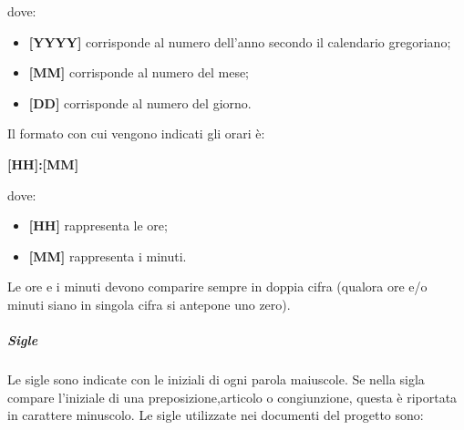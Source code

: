     dove:
    \begin{itemize}
        \item \textbf{[YYYY]} corrisponde al numero dell'anno secondo il calendario gregoriano;
        \item \textbf{[MM]} corrisponde al numero del mese;
        \item \textbf{[DD]} corrisponde al numero del giorno.
    \end{itemize}
Il formato con cui vengono indicati gli orari è:
\begin{center}
    \textbf{[HH]:[MM]}
\end{center} 
dove:
\begin{itemize}
    \item \textbf{[HH]} rappresenta le ore;
    \item \textbf{[MM]} rappresenta i minuti.
\end{itemize}
Le ore e i minuti devono comparire sempre in doppia cifra (qualora ore e/o minuti siano in singola cifra si antepone uno zero). 
\subparagraph{Sigle}
Le sigle sono indicate con le iniziali di ogni parola maiuscole. Se nella sigla compare l'iniziale di una preposizione,articolo o congiunzione, questa è riportata in carattere minuscolo.
Le sigle utilizzate nei documenti del progetto sono:
